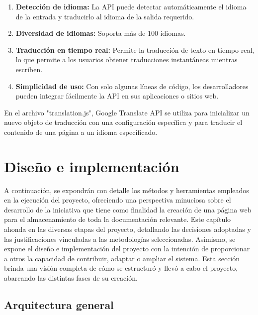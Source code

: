 \documentclass[a4paper, 12pt]{book}
\begin{document}
\begin{enumerate}
  \item \textbf{Detección de idioma:} La API puede detectar automáticamente el idioma de la entrada y traducirlo al idioma de la salida requerido.
  \item \textbf{Diversidad de idiomas:} Soporta más de 100 idiomas.
  \item \textbf{Traducción en tiempo real:} Permite la traducción de texto en tiempo real, lo que permite a los usuarios obtener traducciones instantáneas mientras escriben.
  \item \textbf{Simplicidad de uso:} Con solo algunas líneas de código, los desarrolladores pueden integrar fácilmente la API en sus aplicaciones o sitios web.
\end{enumerate}

En el archivo "translation.js", Google Translate API se utiliza para inicializar un nuevo objeto de traducción con una configuración específica y para traducir el contenido de una página a un idioma especificado.


\cleardoublepage
\chapter{Diseño e implementación}
\label{sec:diseno}

A continuación, se expondrán con detalle los métodos y herramientas empleados en la ejecución del proyecto, ofreciendo una perspectiva minuciosa sobre el desarrollo 
de la iniciativa que tiene como finalidad la creación de una página web para el almacenamiento de toda la documentación relevante. Este capítulo ahonda en las diversas 
etapas del proyecto, detallando las decisiones adoptadas y las justificaciones vinculadas a las metodologías seleccionadas. 
Asimismo, se expone el diseño e implementación del proyecto con la intención de proporcionar a otros la capacidad de contribuir, adaptar o ampliar el sistema. 
Esta sección brinda una visión completa de cómo se estructuró y llevó a cabo el proyecto, abarcando las distintas fases de su creación.


\section{Arquitectura general} 
\label{sec:arquitectura}
\end{document}
